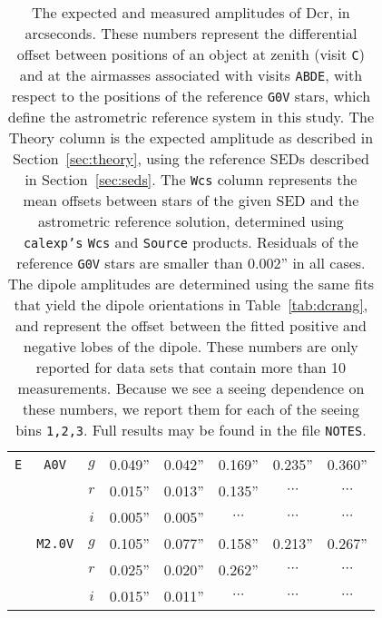 \documentclass[prd, nofootinbib, floatfix, 11pt, tightenlines, times]{article}
\def\A{{\tt A}}
\def\B{{\tt B}}
\def\C{{\tt C}}
\def\D{{\tt D}}
\def\E{{\tt E}}
\begin{document}
\begin{table}
\begin{tabular}{cccccccc}
\hline
\E & {\tt A0V}   & $g$ & 0.049'' & 0.042'' & 0.169''  & 0.235''  & 0.360''  \\
   &             & $r$ & 0.015'' & 0.013'' & 0.135''  & $\cdots$ & $\cdots$ \\
   &             & $i$ & 0.005'' & 0.005'' & $\cdots$ & $\cdots$ & $\cdots$ \\
   & {\tt M2.0V} & $g$ & 0.105'' & 0.077'' & 0.158''  & 0.213''  & 0.267''  \\
   &             & $r$ & 0.025'' & 0.020'' & 0.262''  & $\cdots$ & $\cdots$ \\
   &             & $i$ & 0.015'' & 0.011'' & $\cdots$ & $\cdots$ & $\cdots$ \\
\end{tabular}
\caption[So I can have 2 paragraphs]{The expected and measured
  amplitudes of Dcr, in arcseconds.  These numbers represent the
  differential offset between positions of an object at zenith (visit
  \C) and at the airmasses associated with visits \A\B\D\E, with
  respect to the positions of the reference {\tt G0V} stars, which
  define the astrometric reference system in this study.  The Theory
  column is the expected amplitude as described in
  Section~\ref{sec:theory}, using the reference SEDs described in
  Section~\ref{sec:seds}.  The {\tt Wcs} column represents the mean
  offsets between stars of the given SED and the astrometric reference
  solution, determined using {\tt calexp's} {\tt Wcs} and {\tt Source}
  products.  Residuals of the reference {\tt G0V} stars are smaller
  than 0.002'' in all cases.  The dipole amplitudes are determined
  using the same fits that yield the dipole orientations in
  Table~\ref{tab:dcrang}, and represent the offset between the fitted
  positive and negative lobes of the dipole.  These numbers are only
  reported for data sets that contain more than 10 measurements.
  Because we see a seeing dependence on these numbers, we report them
  for each of the seeing bins {\tt 1,2,3}.  Full results may be found
  in the file {\tt NOTES}.}
\label{tab:dcramp}
\end{table}



\clearpage


\end{document}
